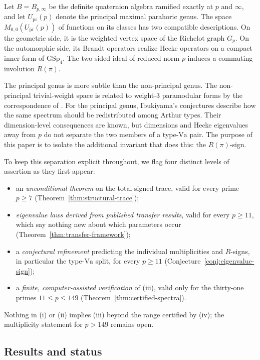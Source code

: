 \documentclass[11pt]{amsart}
\theoremstyle{plain}
\theoremstyle{definition}
\newcommand{\GSp}{\mathrm{GSp}}
\newcommand{\Upr}{U_{\mathrm{pr}}}
\providecommand{\Upr}{U_{\mathrm{pr}}}
\begin{document}
	Let $B=B_{p,\infty}$ be the definite quaternion algebra ramified exactly
	at $p$ and $\infty$, and let $\Upr(p)$ denote the principal maximal
	parahoric genus. The space $M_{0,0}(\Upr(p))$ of functions on its classes
	has two compatible descriptions. On the geometric side, it is the weighted
	vertex space of the Richelot graph $G_p$. On the automorphic side, its Brandt
	operators realize Hecke operators on a compact inner form of $\GSp_4$.
	The two-sided ideal of reduced norm $p$ induces a commuting involution
	$R(\pi)$.
	
	The principal genus is more subtle than the non-principal genus. The
	non-principal trivial-weight space is related to weight-$3$ paramodular
	forms by the correspondence of \cite[\S9]{DPRT}. For the principal genus, Ibukiyama's
	conjectures describe how the same spectrum should be redistributed among
	Arthur types. Their dimension-level consequences are known, but dimensions
	and Hecke eigenvalues away from $p$ do not separate the two members of a
	type-$\mathrm{Va}$ pair. The purpose of this paper is to isolate the additional invariant that does this: the $R(\pi)$-sign.
	
	To keep this separation explicit throughout, we flag four distinct levels of assertion as they first appear:
	\begin{itemize}[leftmargin=2.4em]
		\item[(i)] an \emph{unconditional theorem} on the total signed trace, valid for every prime $p\ge7$ (Theorem~\ref{thm:structural-trace});
		\item[(ii)] \emph{eigenvalue laws derived from published transfer results}, valid for every $p\ge11$, which say nothing new about which parameters occur (Theorem~\ref{thm:transfer-framework});
		\item[(iii)] a \emph{conjectural refinement} predicting the individual multiplicities and $R$-signs, in particular the type-$\mathrm{V\!a}$ split, for every $p\ge11$ (Conjecture~\ref{conj:eigenvalue-sign});
		\item[(iv)] a \emph{finite, computer-assisted verification} of (iii), valid only for the thirty-one primes $11\le p\le149$ (Theorem~\ref{thm:certified-spectra}).
	\end{itemize}
	Nothing in (i) or (ii) implies (iii) beyond the range certified by (iv); the multiplicity statement for $p>149$ remains open.
	
	\subsection{Results and status}\label{ss:results-status}
	
\end{document}
